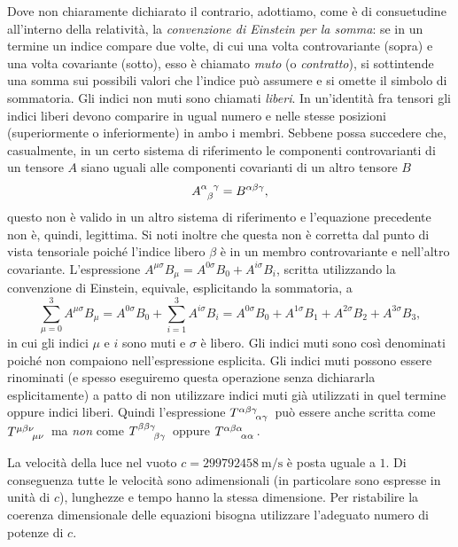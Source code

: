 Dove non chiaramente dichiarato il contrario, adottiamo, come è di consuetudine
all'interno della relatività, la 
\emph{convenzione di Einstein per la somma}: se in un termine un indice compare
due volte, di cui una volta controvariante (sopra) e una volta covariante
(sotto), esso è chiamato \emph{muto} (o \emph{contratto}), si
sottintende una somma sui possibili valori che l'indice può assumere e si omette
il simbolo di sommatoria.  Gli indici non muti sono chiamati
\emph{liberi}.  In un'identità fra tensori gli indici
liberi devono comparire in ugual numero e nelle stesse posizioni (superiormente
o inferiormente) in ambo i membri.  Sebbene possa succedere che, casualmente, in
un certo sistema di riferimento le componenti controvarianti di un tensore $A$
siano uguali alle componenti covarianti di un altro tensore $B$
\begin{equation}
  \tensor{A}{^{\alpha}_{\beta}^{\gamma}} = B^{\alpha\beta\gamma},
\end{equation}
questo non è valido in un altro sistema di riferimento e l'equazione precedente
non è, quindi, legittima.  Si noti inoltre che questa non è corretta dal punto
di vista tensoriale poiché l'indice libero $\beta$ è in un membro controvariante
e nell'altro covariante.  L'espressione
$A^{\mu\sigma}B_{\mu} = A^{0\sigma}B_{0} + A^{i\sigma}B_{i}$, scritta
utilizzando la convenzione di Einstein, equivale, esplicitando la sommatoria, a
\begin{equation}
  \sum_{\mu=0}^{3} A^{\mu\sigma}B_{\mu} = A^{0\sigma}B_{0} + \sum_{i=1}^{3}
  A^{i\sigma}B_{i} = A^{0\sigma}B_{0} + A^{1\sigma}B_{1} + A^{2\sigma}B_{2} +
  A^{3\sigma}B_{3},
\end{equation}
in cui gli indici $\mu$ e $i$ sono muti e $\sigma$ è libero.  Gli indici muti
sono così denominati poiché non compaiono nell'espressione esplicita.  Gli
indici muti possono essere rinominati (e spesso eseguiremo questa operazione
senza dichiararla esplicitamente) a patto di non utilizzare indici muti già
utilizzati in quel termine oppure indici liberi.  Quindi l'espressione
$\tensor{T}{^{\alpha\beta\gamma}_{\alpha\gamma}}$ può essere anche scritta come
$\tensor{T}{^{\mu\beta\nu}_{\mu\nu}}$ ma \emph{non} come
$\tensor{T}{^{\beta\beta\gamma}_{\beta\gamma}}$ oppure
$\tensor{T}{^{\alpha\beta\alpha}_{\alpha\alpha}}$.

La velocità della luce nel vuoto $c = \SI{299792458}{\metre\per\second}$ è posta
uguale a $1$.  Di conseguenza tutte le velocità sono adimensionali (in
particolare sono espresse in unità di $c$), lunghezze e tempo hanno la stessa
dimensione.  Per ristabilire la coerenza dimensionale delle equazioni bisogna
utilizzare l'adeguato numero di potenze di $c$.

